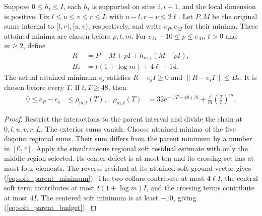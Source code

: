 \begin{lemma}
    \label{lem:soft_parent_structure}
    \leanok
    Suppose $0\le h_i\le I$, each $h_i$ is supported on sites $i,i+1$,
    and the local dimension is positive. Fix $l\le u\le v\le r\le L$
    with $u-l,r-v\le2\ell$. Let $P,M$ be the original sums internal
    to $[l,r),[u,v)$, respectively, and write $e_P,e_M$ for their minima.
    These attained minima are chosen before $p,t,m$.
    For $e_M-10\le p\le e_M$, $t>0$ and $m\ge2$, define
    \begin{align}
        R   & =P-M+pI+h_{m,t}(M-pI),
        \label{eq:soft_parent_operator} \\
        B_* & =t(1+\log m)+4\ell+14.
        \label{eq:soft_parent_budget}
    \end{align}
    The actual attained minimum $e_{\mathrm s}$ satisfies
    $R-e_{\mathrm s}I\ge0$ and $\|R-e_{\mathrm s}I\|\le B_*$.
    It is chosen before every $T$. If $t,T\ge48$, then
    \begin{align}
        0\le e_P-e_{\mathrm s} & \le\rho_{m,t}(T), &
        \rho_{m,t}(T)          & =32e^{-(T-48)/8}
        +\frac{t}{m}\left(\frac{T}{t}\right)^m.
        \label{eq:soft_parent_minimum}
    \end{align}
\end{lemma}
\begin{proof}\leanok
    Restrict the interactions to the parent interval and divide the
    chain at $0,l,u,v,r,L$. The exterior sums vanish. Choose attained
    minima of the five disjoint regional sums. Their sum differs from
    the parent minimum by a number in $[0,4]$. Apply the simultaneous
    regional soft residual estimate with only the middle region selected.
    Its center defect is at most ten and its crossing set has at most
    four elements. The reverse residual at its attained soft ground
    vector gives (\ref{eq:soft_parent_minimum}). The two collars contribute
    at most $4\ell I$, the central soft term contributes at most
    $t(1+\log m)I$, and the crossing terms contribute at most $4I$.
    The centered soft minimum is at least $-10$, giving
    (\ref{eq:soft_parent_budget}).
\end{proof}

